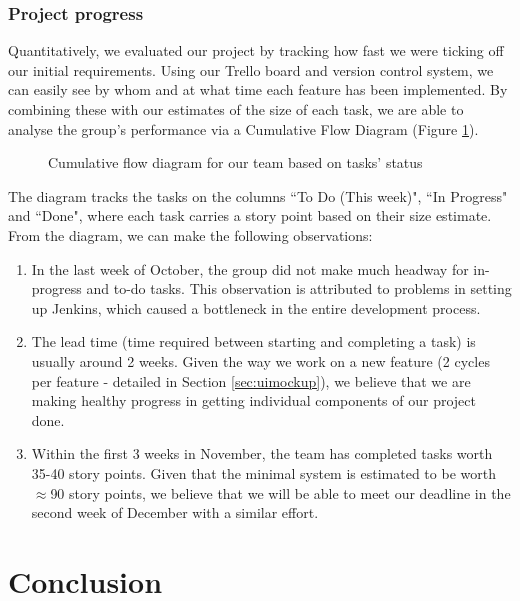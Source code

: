 ﻿\documentclass[a4paper, titlepage]{article}
\begin{document}
\subsubsection{Project progress}
	
Quantitatively, we evaluated our project by tracking how fast we were ticking off our initial requirements. Using our Trello board and version control system, we can easily see by whom and at what time each feature has been implemented. By combining these with our estimates of the size of each task, we are able to analyse the group's performance via a Cumulative Flow Diagram (Figure \ref{fig:cumuflow}).

\begin{figure}[H]
  \caption{Cumulative flow diagram for our team based on tasks' status}
  \label{fig:cumuflow}
\end{figure}

The diagram tracks the tasks on the columns ``To Do (This week)", ``In Progress" and ``Done", where each task carries a story point based on their size estimate. From the diagram, we can make the following observations:

\begin{enumerate}

  \item In the last week of October, the group did not make much headway for in-progress and to-do tasks. This observation is attributed to problems in setting up Jenkins, which caused a bottleneck in the entire development process.

  \item The lead time (time required between starting and completing a task) is usually around 2 weeks. Given the way we work on a new feature (2 cycles per feature - detailed in Section \ref{sec:uimockup}), we believe that we are making healthy progress in getting individual components of our project done.

  \item Within the first 3 weeks in November, the team has completed tasks worth 35-40 story points. Given that the minimal system is estimated to be worth $\approx$90 story points, we believe that we will be able to meet our deadline in the second week of December with a similar effort.

\end{enumerate}


\newpage
\section{Conclusion}
\end{document}
